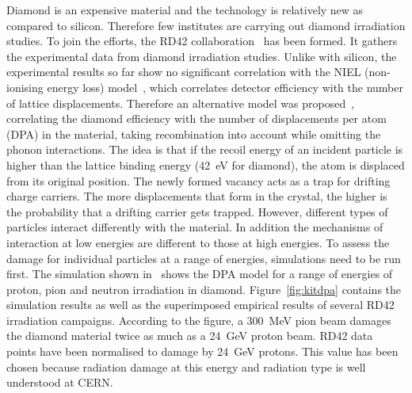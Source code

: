 Diamond is an expensive material and the technology is relatively new as compared to silicon. Therefore few institutes are carrying out diamond irradiation studies. To join the efforts, the RD42 collaboration~\cite{RD42:00000} has been formed. It gathers the experimental data from diamond irradiation studies. Unlike with silicon, the experimental results so far show no significant correlation with the NIEL (non-ionising energy loss) model~\cite{2002NIMPA}, which correlates detector efficiency with the number of lattice displacements. Therefore an alternative model was proposed~\cite{Guthoff:2014223}, correlating the diamond efficiency with the number of displacements per atom (DPA) in the material, taking recombination into account while omitting the phonon interactions. The idea is that if the recoil energy of an incident particle is higher than the lattice binding energy (42~eV for diamond), the atom is displaced from its original position. The newly formed vacancy acts as a trap for drifting charge carriers. The more displacements that form in the crystal, the higher is the probability that a drifting carrier gets trapped. However, different types of particles interact differently with the material. In addition the mechanisms of interaction at low energies are different to those at high energies. To assess the damage for individual particles at a range of energies, simulations need to be run first. The simulation shown in~\cite{Guthoff:2014223} shows the DPA model for a range of energies of proton, pion and neutron irradiation in diamond. Figure~\ref{fig:kitdpa}  contains the simulation results as well as the superimposed empirical results of several RD42 irradiation campaigns. According to the figure, a 300~MeV pion beam damages the diamond material twice as much as a 24~GeV proton beam. RD42 data points have been normalised to damage by 24~GeV protons. This value has been chosen because radiation damage at this energy and radiation type is well understood at CERN.


